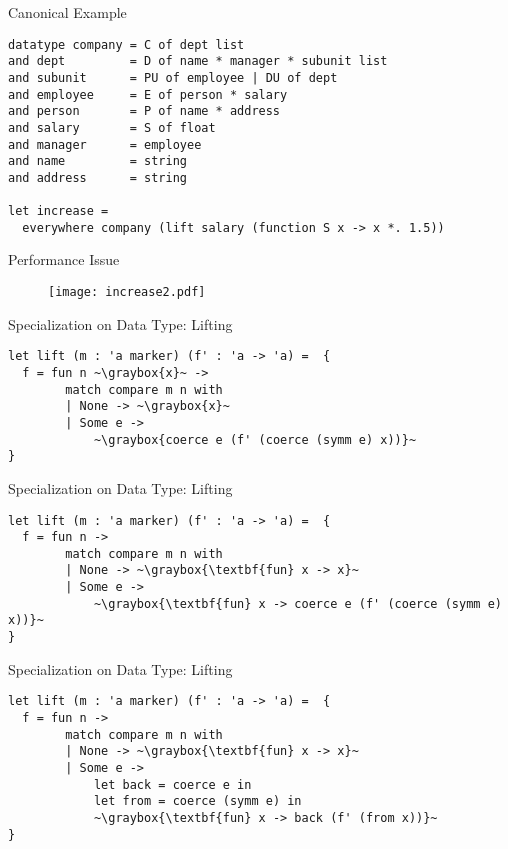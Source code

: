 \begin{frame}[fragile]{Canonical Example}
\begin{lstlisting}
datatype company = C of dept list
and dept         = D of name * manager * subunit list
and subunit      = PU of employee | DU of dept
and employee     = E of person * salary
and person       = P of name * address
and salary       = S of float
and manager      = employee
and name         = string
and address      = string

let increase = 
  everywhere company (lift salary (function S x -> x *. 1.5))
\end{lstlisting}
\end{frame}

\begin{frame}{Performance Issue}
\begin{figure}
\texttt{[image: increase2.pdf]}
\end{figure}
\end{frame}

\begin{frame}[fragile]{Specialization on Data Type: Lifting}
\begin{lstlisting}
let lift (m : 'a marker) (f' : 'a -> 'a) =  {
  f = fun n ~\graybox{x}~ ->
        match compare m n with
        | None -> ~\graybox{x}~
        | Some e ->        
            ~\graybox{coerce e (f' (coerce (symm e) x))}~
}
\end{lstlisting}
\vskip8mm
\end{frame}

\begin{frame}[fragile]{Specialization on Data Type: Lifting}
\begin{lstlisting}
let lift (m : 'a marker) (f' : 'a -> 'a) =  {
  f = fun n ->
        match compare m n with
        | None -> ~\graybox{\textbf{fun} x -> x}~
        | Some e ->        
            ~\graybox{\textbf{fun} x -> coerce e (f' (coerce (symm e) x))}~
}
\end{lstlisting}
\vskip8mm
\end{frame}

\begin{frame}[fragile]{Specialization on Data Type: Lifting}
\begin{lstlisting}
let lift (m : 'a marker) (f' : 'a -> 'a) =  {
  f = fun n ->
        match compare m n with
        | None -> ~\graybox{\textbf{fun} x -> x}~
        | Some e ->        
            let back = coerce e in
            let from = coerce (symm e) in
            ~\graybox{\textbf{fun} x -> back (f' (from x))}~
}
\end{lstlisting}
\end{frame}


